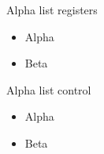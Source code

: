 \documentclass{beamer}
\begin{document}
\begin{frame}{Alpha list registers}
\begin{itemize}
\setlength{\itemsep}{8pt}
\setlength{\parskip}{0pt}
\setlength{\parsep}{0pt}
\item Alpha
\item Beta
\end{itemize}
\end{frame}
\begin{frame}{Alpha list control}
\begin{itemize}
\item Alpha
\item Beta
\end{itemize}
\end{frame}
\end{document}
